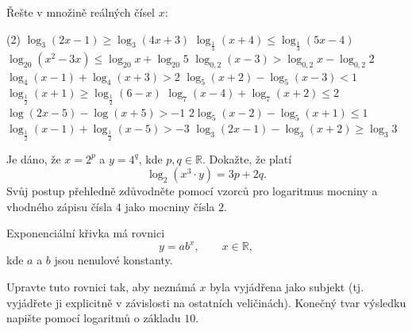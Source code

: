 \begin{exercise}
    Řešte v množině reálných čísel $x$:
    \begin{tasks}(2)
        \task $\log_{3}(2x - 1) \ge \log_{3}(4x + 3)$
        \task $\log_{\frac{1}{3}}(x + 4) \le \log_{\frac{1}{3}}(5x - 4)$
        \task $\log_{20}(x^{2} - 3x) \le \log_{20} x + \log_{20} 5$
        \task $\log_{0{,}2}(x - 3) > \log_{0{,}2} x - \log_{0{,}2} 2$
        \task $\log_{4}(x - 1) + \log_{4}(x + 3) > 2$
        \task $\log_{5}(x + 2) - \log_{5}(x - 3) < 1$
        \task $\log_{\frac{1}{2}}(x + 1) \ge \log_{\frac{1}{2}}(6 - x)$
        \task $\log_{7}(x - 4) + \log_{7}(x + 2) \le 2$
        \task $\log (2x - 5) - \log (x + 5) > -1$
        \task $2\log_{5}(x - 2) - \log_{5}(x + 1) \le 1$
        \task $\log_{\frac{1}{2}}(x - 1) + \log_{\frac{1}{2}}(x - 5) > -3$
        \task $\log_{3}(2x - 1) - \log_{3}(x + 2) \ge \log_{3} 3$
    \end{tasks}
\end{exercise}


\setcounter{section}{3}
\begin{exercise}
    Je dáno, že $x = 2^{p}$ a $y = 4^{q}$, kde $p, q \in \mathbb{R}$.
    Dokažte, že platí
    \[
        \log_{2}\left(x^{3} \cdot y\right) = 3p + 2q.
    \]
    Svůj postup přehledně zdůvodněte pomocí vzorců pro logaritmus mocniny
    a vhodného zápisu čísla $4$ jako mocniny čísla $2$.
\end{exercise}


\begin{exercise}
    Exponenciální křivka má rovnici
    \[
        y = a b^{x}, \qquad x \in \mathbb{R},
    \]
    kde $a$ a $b$ jsou nenulové konstanty.

    Upravte tuto rovnici tak, aby neznámá $x$ byla vyjádřena jako subjekt
    (tj. vyjádřete ji explicitně v závislosti na ostatních veličinách).
    Konečný tvar výsledku napište pomocí logaritmů o základu $10$.
\end{exercise}


